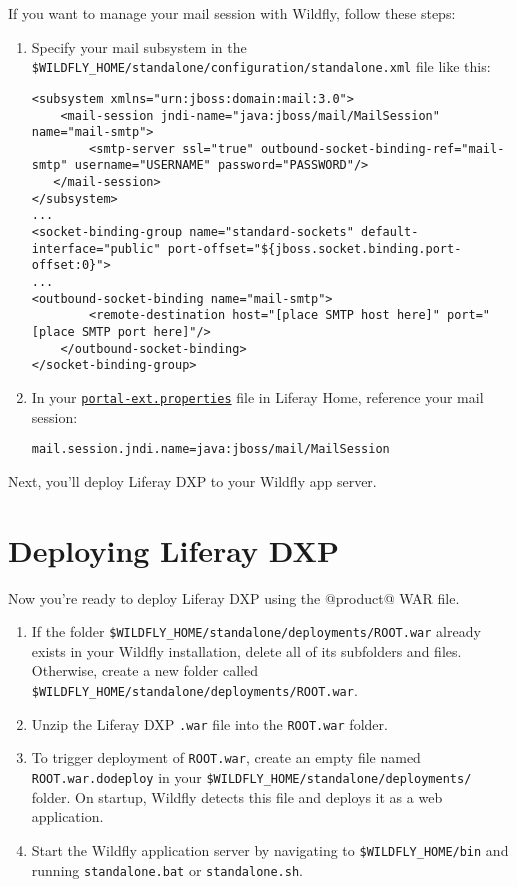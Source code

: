 If you want to manage your mail session with Wildfly, follow these
steps:

\begin{enumerate}
\def\labelenumi{\arabic{enumi}.}
\item
  Specify your mail subsystem in the
  \texttt{\$WILDFLY\_HOME/standalone/configuration/standalone.xml} file
  like this:

\begin{verbatim}
<subsystem xmlns="urn:jboss:domain:mail:3.0">
    <mail-session jndi-name="java:jboss/mail/MailSession" name="mail-smtp">
        <smtp-server ssl="true" outbound-socket-binding-ref="mail-smtp" username="USERNAME" password="PASSWORD"/>
   </mail-session>
</subsystem>
...
<socket-binding-group name="standard-sockets" default-interface="public" port-offset="${jboss.socket.binding.port-offset:0}">
...
<outbound-socket-binding name="mail-smtp">
        <remote-destination host="[place SMTP host here]" port="[place SMTP port here]"/>
    </outbound-socket-binding>
</socket-binding-group>
\end{verbatim}
\item
  In your
  \href{/docs/7-2/deploy/-/knowledge_base/d/portal-properties}{\texttt{portal-ext.properties}}
  file in Liferay Home, reference your mail session:

\begin{verbatim}
mail.session.jndi.name=java:jboss/mail/MailSession
\end{verbatim}
\end{enumerate}

Next, you'll deploy Liferay DXP to your Wildfly app server.

\section{Deploying Liferay DXP}\label{deploying-liferay-dxp-2}

Now you're ready to deploy Liferay DXP using the @product@ WAR file.

\begin{enumerate}
\def\labelenumi{\arabic{enumi}.}
\item
  If the folder \texttt{\$WILDFLY\_HOME/standalone/deployments/ROOT.war}
  already exists in your Wildfly installation, delete all of its
  subfolders and files. Otherwise, create a new folder called
  \texttt{\$WILDFLY\_HOME/standalone/deployments/ROOT.war}.
\item
  Unzip the Liferay DXP \texttt{.war} file into the \texttt{ROOT.war}
  folder.
\item
  To trigger deployment of \texttt{ROOT.war}, create an empty file named
  \texttt{ROOT.war.dodeploy} in your
  \texttt{\$WILDFLY\_HOME/standalone/deployments/} folder. On startup,
  Wildfly detects this file and deploys it as a web application.
\item
  Start the Wildfly application server by navigating to
  \texttt{\$WILDFLY\_HOME/bin} and running \texttt{standalone.bat} or
  \texttt{standalone.sh}.
\end{enumerate}

